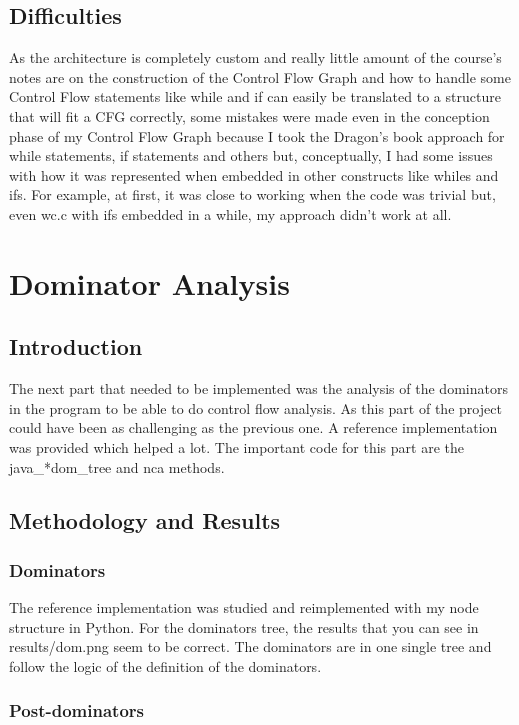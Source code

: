\documentclass[conference,compsoc]{IEEEtran}
\begin{document}
\subsection{Difficulties}

 As the architecture is completely custom and really little amount of the course's notes are on the construction of the
 Control Flow Graph and how to handle some Control Flow statements like while and if can easily be translated to
 a structure that will fit a CFG correctly, some mistakes were made even in the conception phase of my Control Flow Graph
 because I took the Dragon's book approach for while statements, if statements and others but, conceptually, I had
 some issues with how it was represented when embedded in other constructs like whiles and ifs. For example, at first, it was close
 to working when the code was trivial but, even wc.c with ifs embedded in a while, my approach didn't work at all.

\section{Dominator Analysis}

\subsection{Introduction}
The next part that needed to be implemented was the analysis of the dominators in the program to be able to do
 control flow analysis. As this part of the project could have been as challenging as the previous one. A reference
 implementation was provided which helped a lot. The important code for this part are the java\_*dom\_tree and nca methods.

\subsection{Methodology and Results}
\subsubsection{Dominators}

The reference implementation was studied and reimplemented with my node structure in Python. For the dominators tree,
 the results that you can see in results/dom.png seem to be correct. The dominators are in one single tree and follow
 the logic of the definition of the dominators.

\subsubsection{Post-dominators}
\end{document}
